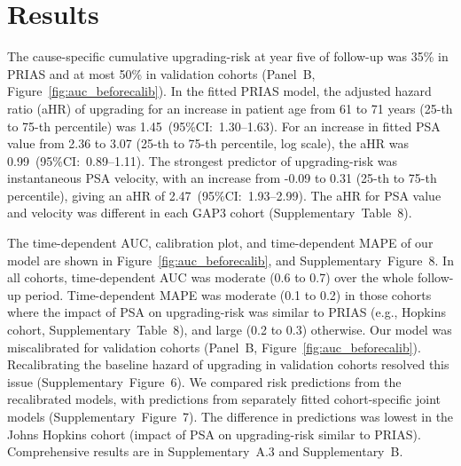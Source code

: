 \section{Results}
The cause-specific cumulative upgrading-risk at year five of follow-up was 35\% in PRIAS and at most 50\% in validation cohorts (Panel~B, Figure~\ref{fig:auc_beforecalib}). In the fitted PRIAS model, the adjusted hazard ratio (aHR) of upgrading for an increase in patient age from 61 to 71 years (25-th to 75-th percentile) was 1.45~(95\%CI:~1.30--1.63). For an increase in fitted PSA value from 2.36 to 3.07 (25-th to 75-th percentile, log scale), the aHR was 0.99~(95\%CI:~0.89--1.11). The strongest predictor of upgrading-risk was instantaneous PSA velocity, with an increase from -0.09 to 0.31 (25-th to 75-th percentile), giving an aHR of 2.47~(95\%CI:~1.93--2.99). The aHR for PSA value and velocity was different in each GAP3 cohort (Supplementary~Table~8).

The time-dependent AUC, calibration plot, and time-dependent MAPE of our model are shown in Figure~\ref{fig:auc_beforecalib}, and Supplementary~Figure~8. In all cohorts, time-dependent AUC was moderate (0.6 to 0.7) over the whole follow-up period. Time-dependent MAPE was moderate (0.1 to 0.2) in those cohorts where the impact of PSA on upgrading-risk was similar to PRIAS (e.g., Hopkins cohort, Supplementary~Table~8), and large (0.2 to 0.3) otherwise. Our model was miscalibrated for validation cohorts (Panel~B, Figure~\ref{fig:auc_beforecalib}). Recalibrating the baseline hazard of upgrading in validation cohorts resolved this issue (Supplementary~Figure~6). We compared risk predictions from the recalibrated models, with predictions from separately fitted cohort-specific joint models (Supplementary~Figure~7). The difference in predictions was lowest in the Johns Hopkins cohort (impact of PSA on upgrading-risk similar to PRIAS). Comprehensive results are in Supplementary~A.3 and Supplementary~B.

